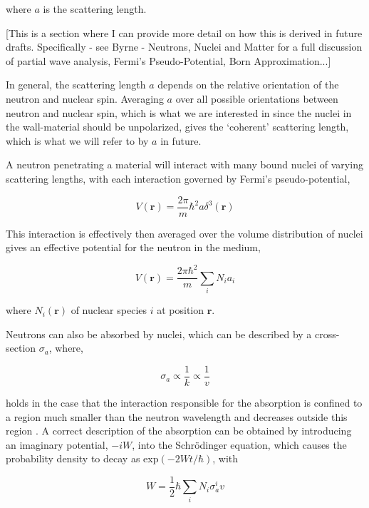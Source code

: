 \documentclass[11pt,a4paper,oneside]{article}
\begin{document}
where $a$ is the scattering length. 

[This is a section where I can provide more detail on how this is derived in future drafts. Specifically - see Byrne - Neutrons, Nuclei and Matter for a full discussion of partial wave analysis, Fermi's Pseudo-Potential, Born Approximation...]

In general, the scattering length $a$ depends on the relative orientation of the neutron and nuclear spin. Averaging $a$ over all possible orientations between neutron and nuclear spin, which is what we are interested in since the nuclei in the wall-material should be unpolarized, gives the `coherent' scattering length, which is what we will refer to by $a$ in future. 

A neutron penetrating a material will interact with many bound nuclei of varying scattering lengths, with each interaction governed by Fermi's pseudo-potential,

\begin{equation}
V(\mathbf{r}) = \frac{2\pi}{m}\hbar^{2}a\delta^{3}(\mathbf{r})
\label{eqn:fermipseudopotential}
\end{equation}

This interaction is effectively then averaged over the volume distribution of nuclei gives an effective potential for the neutron in the medium,

\begin{equation}
V(\mathbf{r}) = \frac{2\pi\hbar^{2}}{m} \sum_{i} N_{i}a_{i}
\label{eqn:meanfermipotential}
\end{equation}

where $N_{i}(\mathbf{r})$ of nuclear species $i$ at position $\mathbf{r}$. 

Neutrons can also be absorbed by nuclei, which can be described by a cross-section $\sigma_{a}$, where,

\begin{equation}
\sigma_{a} \propto \frac{1}{k} \propto \frac{1}{v}
\label{eqn:absorptioncrosssection}
\end{equation}

holds in the case that the interaction responsible for the absorption is confined to a region much smaller than the neutron wavelength and decreases outside this region \cite{Go.Ri.La.91}. A correct description of the absorption can be obtained by introducing an imaginary potential, $-iW$, into the Schr\"{o}dinger equation, which causes the probability density to decay as exp$(-2Wt/\hbar)$, with

\begin{equation}
W = \frac{1}{2}\hbar \sum_{i} N_{i} \sigma_{a}^{i} v 
\label{eqn:absorptionpotential}
\end{equation}
\end{document}
